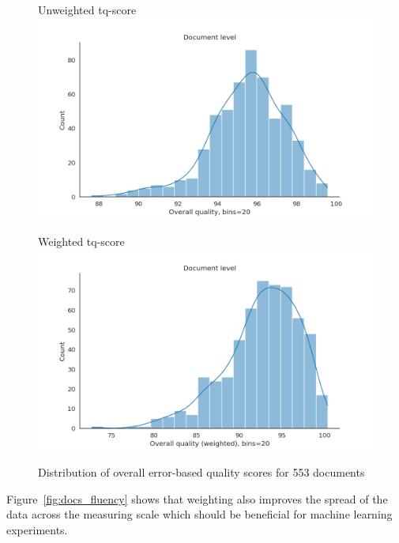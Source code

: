\begin{figure}
	\begin{minipage}[c]{0.45\linewidth}
		\centering
		Unweighted tq-score
		\includegraphics[width=\linewidth]{figures/err/doc-tq-noweights.png}
	\end{minipage}
	\begin{minipage}[c]{0.45\linewidth}
		\centering
		Weighted tq-score
		\includegraphics[width=\linewidth]{figures/err/doc-tq-major2critical5weighted.png}
	\end{minipage}	
	\caption{\label{fig:tq}Distribution of overall error-based quality scores for 553 documents}	
\end{figure}

Figure~\ref{fig:docs_fluency} shows that weighting also improves the spread of the data across the measuring scale which should be beneficial for machine learning experiments.

